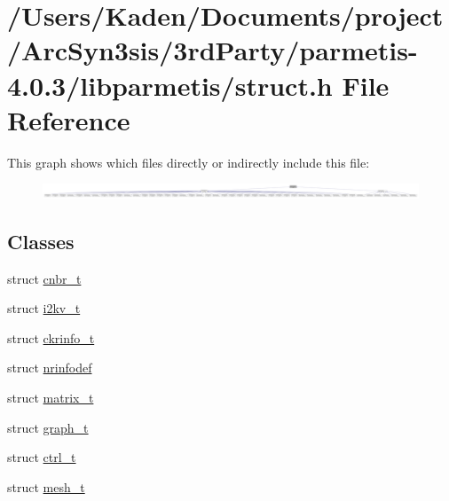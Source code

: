 \hypertarget{a00978}{}\section{/\+Users/\+Kaden/\+Documents/project/\+Arc\+Syn3sis/3rd\+Party/parmetis-\/4.0.3/libparmetis/struct.h File Reference}
\label{a00978}
This graph shows which files directly or indirectly include this file\+:\nopagebreak
\begin{figure}[H]
\begin{center}
\leavevmode
\includegraphics[width=350pt]{a00980}
\end{center}
\end{figure}
\subsection*{Classes}
\begin{DoxyCompactItemize}
\item 
struct \hyperlink{a00714}{cnbr\+\_\+t}
\item 
struct \hyperlink{a00746}{i2kv\+\_\+t}
\item 
struct \hyperlink{a00718}{ckrinfo\+\_\+t}
\item 
struct \hyperlink{a00750}{nrinfodef}
\item 
struct \hyperlink{a00754}{matrix\+\_\+t}
\item 
struct \hyperlink{a00734}{graph\+\_\+t}
\item 
struct \hyperlink{a00742}{ctrl\+\_\+t}
\item 
struct \hyperlink{a00738}{mesh\+\_\+t}
\end{DoxyCompactItemize}
